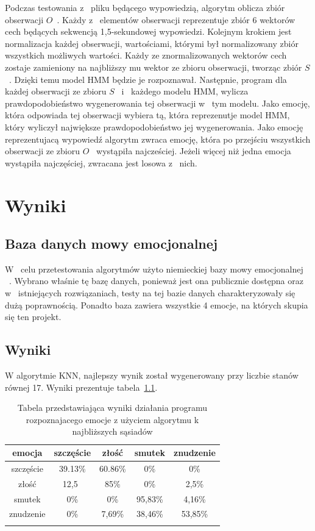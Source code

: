 \documentclass[declaration,shortabstract]{iithesis}
\begin{document}
Podczas testowania z~ pliku będącego wypowiedzią, algorytm oblicza zbiór obserwacji $O$~. Każdy z~ elementów obserwacji reprezentuje zbiór 6 wektorów cech będących sekwencją 1,5-sekundowej wypowiedzi. Kolejnym krokiem jest normalizacja każdej obserwacji, wartościami, którymi był normalizowany zbiór wszystkich możliwych wartości. Każdy ze znormalizowanych wektorów cech zostaje zamieniony na najbliższy mu wektor ze zbioru obserwacji, tworząc zbiór $S$~. Dzięki temu model HMM będzie je rozpoznawał. Następnie, program dla każdej obserwacji ze zbioru $S$~ i~ każdego modelu HMM, wylicza prawdopodobieństwo wygenerowania tej obserwacji w~ tym modelu. Jako emocję, która odpowiada tej obserwacji wybiera tą, która reprezenutje model HMM, który wyliczył największe prawdopodobieństwo jej wygenerowania. Jako emocję reprezentujacą wypowiedź algorytm zwraca emocję, która po przejściu wszystkich obserwacji ze zbioru $O$~ wystąpiła najcześciej. Jeżeli więcej niż jedna emocja wystąpiła najczęściej, zwracana jest losowa z~ nich.

\chapter{Wyniki}
\section{Baza danych mowy emocjonalnej}
W~ celu przetestowania algorytmów użyto niemieckiej bazy mowy emocjonalnej ~\cite{BDemo}. Wybrano właśnie tę bazę danych, ponieważ jest ona publicznie dostępna oraz w~ istniejących rozwiązaniach, testy na tej bazie danych charakteryzowały się dużą poprawnością. Ponadto baza zawiera wszystkie 4 emocje, na których skupia się ten projekt.

\section{Wyniki}
W algorytmie KNN, najlepszy wynik został wygenerowany przy liczbie stanów równej 17. Wyniki prezentuje tabela~\ref{KNN_result}.

\begin{table}[p]
\caption{Tabela przedstawiająca wyniki działania programu rozpoznajacego emocje z użyciem algorytmu k najbliższych sąsiadów}
\begin{center}
  \begin{tabular}{|c|c|c|c|c|}
    \hline
    emocja & szczęście & złość & smutek & znudzenie \\ \hline
    szczęście & 39.13\% & 60.86\% & 0\% & 0\% \\ \hline
	złość & 12,5\ & 85\% & 0\% & 2,5\% \\ \hline
	smutek & 0\% & 0\% & 95,83\% & 4,16\% \\ \hline
	znudzenie & 0\% & 7,69\% & 38,46\% & 53,85\%\\ \hline
    \label{KNN_result}
  \end{tabular}
\end{center}
\end{table}
\end{document}
